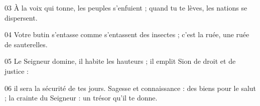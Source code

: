
03 À la voix qui tonne, les peuples s’enfuient ; quand tu te lèves, les nations se dispersent.

04 Votre butin s’entasse comme s’entassent des insectes ; c’est la ruée, une ruée de sauterelles.

05 Le Seigneur domine, il habite les hauteurs ; il emplit Sion de droit et de justice :

06 il sera la sécurité de tes jours. Sagesse et connaissance : des biens pour le salut ; la crainte du Seigneur : un trésor qu’il te donne.
